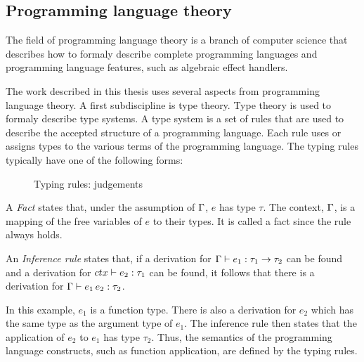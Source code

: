 \subsection{Programming language theory}
The field of programming language theory is a branch of computer science that describes how to formaly describe complete programming languages and programming language features, such as algebraic effect handlers.

The work described in this thesis uses several aspects from programming language theory. A first subdiscipline is type theory. Type theory is used to formaly describe type systems. A type system is a set of rules that are used to describe the accepted structure of a programming language. Each rule uses or assigns types to the various terms of the programming language. The typing rules typically have one of the following forms:

\begin{figure}[!htb]
\begin{center}
\begin{minipage}{0.95\columnwidth}
\begin{mathpar}

\end{mathpar}
\end{minipage}
\end{center}
\caption{Typing rules: judgements}\label{fig:judgement}
\end{figure}

A \textit{Fact} states that, under the assumption of $\ctx$, $e$ has type $\tau$. The context, $\ctx$, is a mapping of the free variables of $e$ to their types. It is called a fact since the rule always holds.

An \textit{Inference rule} states that, if a derivation for $\ctx \ent e_1 : \tau_1 \to \tau_2$ can be found and a derivation for $ctx \ent e_2 : \tau_1$ can be found, it follows that there is a derivation for $\ctx \ent e_1 \, e_2 : \tau_2$. 

In this example, $e_1$ is a function type. There is also a derivation for $e_2$ which has the same type as the argument type of $e_1$. The inference rule then states that the application of $e_2$ to $e_1$ has type $\tau_2$. Thus, the semantics of the programming language constructs, such as function application, are defined by the typing rules. 

